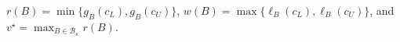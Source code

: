 \(r(B)=\min\{g_B(c_L),g_B(c_U)\}\), \(w(B)=\max\{\ell_B(c_L),\ell_B(c_U)\}\), and \(v^\star=\max_{B\in\mathcal B_\kappa}r(B)\).